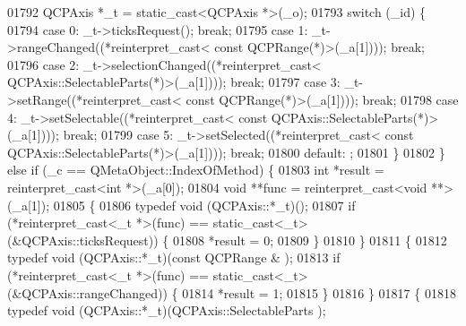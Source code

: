 \begin{DoxyCode}
01792         QCPAxis *\_t = \textcolor{keyword}{static\_cast<}QCPAxis *\textcolor{keyword}{>}(\_o);
01793         \textcolor{keywordflow}{switch} (\_id) \{
01794         \textcolor{keywordflow}{case} 0: \_t->ticksRequest(); \textcolor{keywordflow}{break};
01795         \textcolor{keywordflow}{case} 1: \_t->rangeChanged((*\textcolor{keyword}{reinterpret\_cast<} \textcolor{keyword}{const }QCPRange(*)\textcolor{keyword}{>}(\_a[1]))); \textcolor{keywordflow}{break};
01796         \textcolor{keywordflow}{case} 2: \_t->selectionChanged((*\textcolor{keyword}{reinterpret\_cast<} QCPAxis::SelectableParts(*)\textcolor{keyword}{>}(\_a[1]))); \textcolor{keywordflow}{break};
01797         \textcolor{keywordflow}{case} 3: \_t->setRange((*\textcolor{keyword}{reinterpret\_cast<} \textcolor{keyword}{const }QCPRange(*)\textcolor{keyword}{>}(\_a[1]))); \textcolor{keywordflow}{break};
01798         \textcolor{keywordflow}{case} 4: \_t->setSelectable((*\textcolor{keyword}{reinterpret\_cast<} \textcolor{keyword}{const }QCPAxis::SelectableParts(*)\textcolor{keyword}{>}(\_a[1]))); \textcolor{keywordflow}{break};
01799         \textcolor{keywordflow}{case} 5: \_t->setSelected((*\textcolor{keyword}{reinterpret\_cast<} \textcolor{keyword}{const }QCPAxis::SelectableParts(*)\textcolor{keyword}{>}(\_a[1]))); \textcolor{keywordflow}{break};
01800         \textcolor{keywordflow}{default}: ;
01801         \}
01802     \} \textcolor{keywordflow}{else} \textcolor{keywordflow}{if} (\_c == QMetaObject::IndexOfMethod) \{
01803         \textcolor{keywordtype}{int} *result = \textcolor{keyword}{reinterpret\_cast<}\textcolor{keywordtype}{int} *\textcolor{keyword}{>}(\_a[0]);
01804         \textcolor{keywordtype}{void} **func = \textcolor{keyword}{reinterpret\_cast<}\textcolor{keywordtype}{void} **\textcolor{keyword}{>}(\_a[1]);
01805         \{
01806             \textcolor{keyword}{typedef} void (QCPAxis::*\_t)();
01807             \textcolor{keywordflow}{if} (*reinterpret\_cast<\_t *>(func) == \textcolor{keyword}{static\_cast<}\_t\textcolor{keyword}{>}(&QCPAxis::ticksRequest)) \{
01808                 *result = 0;
01809             \}
01810         \}
01811         \{
01812             \textcolor{keyword}{typedef} void (QCPAxis::*\_t)(\textcolor{keyword}{const} QCPRange & );
01813             \textcolor{keywordflow}{if} (*reinterpret\_cast<\_t *>(func) == \textcolor{keyword}{static\_cast<}\_t\textcolor{keyword}{>}(&QCPAxis::rangeChanged)) \{
01814                 *result = 1;
01815             \}
01816         \}
01817         \{
01818             \textcolor{keyword}{typedef} void (QCPAxis::*\_t)(QCPAxis::SelectableParts );

\end{DoxyCode}
